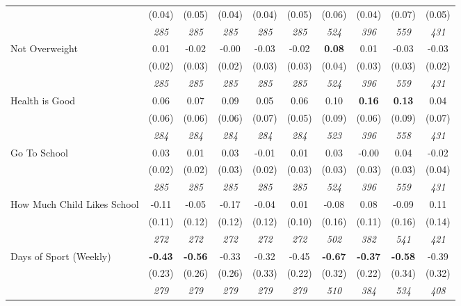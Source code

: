 \begin{tabular}{l c c c c c c c c c}
& (0.04) & (0.05) & (0.04) & (0.04) & (0.05) & (0.06) & (0.04) & (0.07) & (0.05) \\
& \textit{ 285 } & \textit{ 285 } & \textit{ 285 } & \textit{ 285 } & \textit{ 285 } & \textit{ 524 } & \textit{ 396 } & \textit{ 559 } & \textit{ 431 } \\
Not Overweight & 0.01 & -0.02 & -0.00 & -0.03 & -0.02 & \textbf{ 0.08 } & 0.01 & -0.03 & -0.03 \\
& (0.02) & (0.03) & (0.02) & (0.03) & (0.03) & (0.04) & (0.03) & (0.03) & (0.02) \\
& \textit{ 285 } & \textit{ 285 } & \textit{ 285 } & \textit{ 285 } & \textit{ 285 } & \textit{ 524 } & \textit{ 396 } & \textit{ 559 } & \textit{ 431 } \\
Health is Good & 0.06 & 0.07 & 0.09 & 0.05 & 0.06 & 0.10 & \textbf{0.16} & \textbf{ 0.13 } & 0.04 \\
& (0.06) & (0.06) & (0.06) & (0.07) & (0.05) & (0.09) & (0.06) & (0.09) & (0.07) \\
& \textit{ 284 } & \textit{ 284 } & \textit{ 284 } & \textit{ 284 } & \textit{ 284 } & \textit{ 523 } & \textit{ 396 } & \textit{ 558 } & \textit{ 431 } \\
Go To School & 0.03 & 0.01 & 0.03 & -0.01 & 0.01 & 0.03 & -0.00 & 0.04 & -0.02 \\
& (0.02) & (0.02) & (0.03) & (0.02) & (0.03) & (0.03) & (0.03) & (0.03) & (0.04) \\
& \textit{ 285 } & \textit{ 285 } & \textit{ 285 } & \textit{ 285 } & \textit{ 285 } & \textit{ 524 } & \textit{ 396 } & \textit{ 559 } & \textit{ 431 } \\
How Much Child Likes School & -0.11 & -0.05 & -0.17 & -0.04 & 0.01 & -0.08 & 0.08 & -0.09 & 0.11 \\
& (0.11) & (0.12) & (0.12) & (0.12) & (0.10) & (0.16) & (0.11) & (0.16) & (0.14) \\
& \textit{ 272 } & \textit{ 272 } & \textit{ 272 } & \textit{ 272 } & \textit{ 272 } & \textit{ 502 } & \textit{ 382 } & \textit{ 541 } & \textit{ 421 } \\
Days of Sport (Weekly) & \textbf{ -0.43 } & \textbf{ -0.56 } & -0.33 & -0.32 & -0.45 & \textbf{ -0.67 } & \textbf{-0.37} & \textbf{ -0.58 } & -0.39 \\
& (0.23) & (0.26) & (0.26) & (0.33) & (0.22) & (0.32) & (0.22) & (0.34) & (0.32) \\
& \textit{ 279 } & \textit{ 279 } & \textit{ 279 } & \textit{ 279 } & \textit{ 279 } & \textit{ 510 } & \textit{ 384 } & \textit{ 534 } & \textit{ 408 } \\

\end{tabular}
